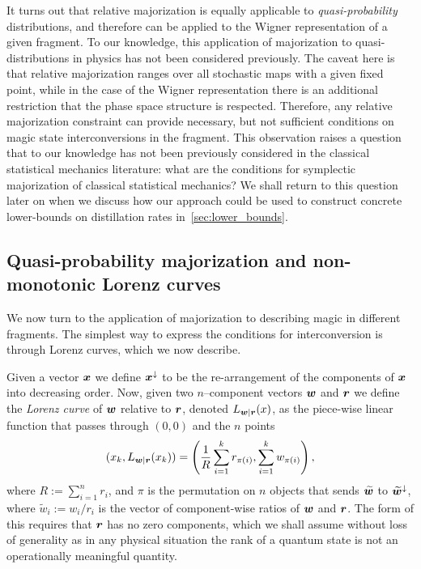 \documentclass[pra,
aps,
twocolumn,
superscriptaddress,
groupedaddress,
nofootinbib,
reprint
]{revtex4-1}
\begin{document}
It turns out that relative majorization is equally applicable to \emph{quasi-probability} distributions, and therefore can be applied to the Wigner representation of a given fragment. To our knowledge, this application of majorization to quasi-distributions in  physics has not been considered previously. The caveat here is that relative majorization ranges over all stochastic maps with a given fixed point, while in the case of the Wigner representation there is an additional restriction that the phase space structure is respected. Therefore, any relative majorization constraint can provide necessary, but not sufficient conditions on magic state interconversions in the fragment. This observation raises a question that to our knowledge has not been previously considered in the classical statistical mechanics literature: what are the conditions for symplectic majorization of classical statistical mechanics? We shall return to this question later on when we discuss how our approach could be used to construct concrete lower-bounds on distillation rates in~\cref{sec:lower_bounds}.

\subsection{Quasi-probability majorization and non-monotonic Lorenz curves}

We now turn to the application of majorization to describing magic in different fragments. The simplest way to express the conditions for interconversion is through Lorenz curves, which we now describe.

Given a vector $\boldsymbol{x}$ we define $\boldsymbol{x}^\downarrow$ to be the re-arrangement of the components of $\boldsymbol{x}$ into decreasing order. Now, given two $n$--component vectors $\boldsymbol{w}$ and $\boldsymbol{r}$ we define the \emph{Lorenz curve} of $\boldsymbol{w}$ relative to $\boldsymbol{r}$, denoted $L_{\boldsymbol{w}|\boldsymbol{r}}(x)$, as the piece-wise linear function that passes through $(0,0)$ and the $n$ points
\begin{equation}\label{eq:lorenz}
        (x_k,L_{\boldsymbol{w}|\boldsymbol{r}}(x_k)) =\left( \frac{1}{R}\sum_{i=1}^k r_{\pi(i)}, \sum_{i=1}^k w_{\pi(i)} \right),
\end{equation}
where $R:= \sum_{i=1}^n r_i$, and $\pi$ is the permutation on $n$ objects that sends $\widetilde{\boldsymbol{w}}$ to $\widetilde{\boldsymbol{w}}^{\downarrow}$, where $\widetilde{w}_i := w_i/r_i$ is the vector of component-wise ratios of $\boldsymbol{w}$ and $\boldsymbol{r}$. The form of this requires that $\boldsymbol{r}$ has no zero components, which we shall assume without loss of generality as in any physical situation the rank of a quantum state is not an operationally meaningful quantity.
\end{document}
